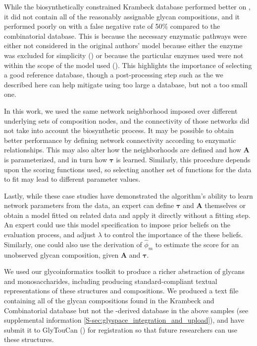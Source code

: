     While the biosynthetically constrained Krambeck database performed better on \rpserum,
    it did not contain all of the reasonably assignable glycan compositions, and it performed
    poorly on \philbs with a false negative rate of 50\% compared to the combinatorial database.
    This is because the necessary enzymatic pathways were either not considered in the original
    authors' model because either the enzyme was excluded for simplicity (\cite{Krambeck2009}) or
    because the particular enzymes used were not within the scope of the model used
    (\cite{Spiro2000,Ichimiya2014}). This highlights the importance of selecting a good reference
    database, though a post-processing step such as the we described here can help mitigate using
    too large a database, but not a too small one.

    In this work, we used the same network neighborhood imposed over different underlying sets of
    composition nodes, and the connectivity of those networks did not take into account the biosynthetic
    process. It may be possible to obtain better performance by defining network connectivity according
    to enzymatic relationships. This may also alter how the neighborhoods are defined and how $\mathbf{A}$
    is parameterized, and in turn how $\mathbf{\tau}$ is learned. Similarly, this procedure depends upon
    the scoring functions used, so selecting another set of functions for the data to fit may lead
    to different parameter values.

    Lastly, while these case studies have demonstrated the algorithm's ability to learn network parameters
    from the data, an expert can define $\mathbf{\tau}$ and $\mathbf{A}$ themselves or obtain a model fitted
    on related data and apply it directly without a fitting step. An expert could use this model specification
    to impose prior beliefs on the evaluation process, and adjust $\lambda$ to control the importance of
    the these beliefs. Similarly, one could also use the derivation of ${\hat \phi_m}$ to estimate the score
    for an unobserved glycan composition, given $\mathbf{A}$ and $\mathbf{\tau}$.

    We used our glycoinformatics toolkit to produce a richer abstraction of glycans and monosaccharides,
    including producing standard-compliant textual representations of these structures and compositions.
    We produced a text file containing all of the glycan compositions found in the Krambeck and Combinatorial
    database but not the \glyspace-derived database in the above samples (see supplemental information
    \ref{S-sec:glyspace_integration_and_upload}),
    and have submit it to GlyTouCan (\cite{Tiemeyer2017}) for registration so that future researchers can
    use these structures.

